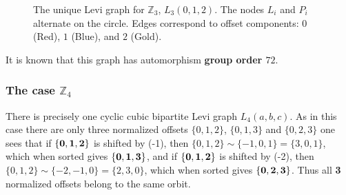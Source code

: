 \documentclass[12pt,letterpaper]{amsart}
\begin{document}
\begin{figure}[H]
    \centering
    \caption{The unique Levi graph for $\mathbb{Z}_3$, $L_3(0,1,2)$. The nodes $L_i$ and $P_i$ alternate on the circle. Edges correspond to offset components: $0$ (Red), $1$ (Blue), and $2$ (Gold).}
    \label{fig:L4_graph}
\end{figure}
It is known that this graph has automorphism {\bf group order $72$}. 
  
\subsubsection{The case  $\mathbb{Z}_4$}
There is precisely one cyclic cubic bipartite Levi graph $L_4(a,b,c)$. As in this case there are only three normalized offsets $\{0,1,2\}$, $\{0,1,3\}$ and $\{0,2,3\}$ one sees that if ${\bf \{0,1,2\}}$ is shifted by (-1), then $\{0,1,2\}\sim\{-1,0,1\}=\{3,0,1\}$, which when sorted gives ${\bf \{0,1,3\}}$, and if ${\bf \{0,1,2\}}$ is shifted by (-2), then $\{0,1,2\}\sim\{-2,-1,0\}=\{2,3,0\}$, which when sorted gives ${\bf\{ 0,2,3\}}$. Thus all \textbf{3} normalized offsets belong to the same orbit.
\end{document}
